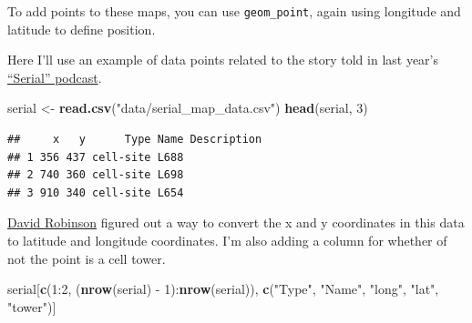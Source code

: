 \documentclass[]{book}
\makeatletter
\newenvironment{Shaded}{\begin{snugshade}}{\end{snugshade}}
\newcommand{\KeywordTok}[1]{\textcolor[rgb]{0.13,0.29,0.53}{\textbf{{#1}}}}
\newcommand{\DataTypeTok}[1]{\textcolor[rgb]{0.13,0.29,0.53}{{#1}}}
\newcommand{\DecValTok}[1]{\textcolor[rgb]{0.00,0.00,0.81}{{#1}}}
\newcommand{\FloatTok}[1]{\textcolor[rgb]{0.00,0.00,0.81}{{#1}}}
\newcommand{\StringTok}[1]{\textcolor[rgb]{0.31,0.60,0.02}{{#1}}}
\newcommand{\NormalTok}[1]{{#1}}
\newenvironment{kframe}{%
\medskip{}
\setlength{\fboxsep}{.8em}
 \def\at@end@of@kframe{}%
 \ifinner\ifhmode%
  \def\at@end@of@kframe{\end{minipage}}%
  \begin{minipage}{\columnwidth}%
 \fi\fi%
 \def\FrameCommand##1{\hskip\@totalleftmargin \hskip-\fboxsep
 \colorbox{shadecolor}{##1}\hskip-\fboxsep
     \hskip-\linewidth \hskip-\@totalleftmargin \hskip\columnwidth}%
 \MakeFramed {\advance\hsize-\width
   \@totalleftmargin\z@ \linewidth\hsize
   \@setminipage}}%
 {\par\unskip\endMakeFramed%
 \at@end@of@kframe}
\renewenvironment{Shaded}{\begin{kframe}}{\end{kframe}}
\makeatother
\begin{document}
To add points to these maps, you can use \texttt{geom\_point}, again
using longitude and latitude to define position. \bigskip

Here I'll use an example of data points related to the story told in
last year's \href{http://serialpodcast.org}{``Serial'' podcast}.

\begin{Shaded}
\begin{Highlighting}[]
\NormalTok{serial <-}\StringTok{ }\KeywordTok{read.csv}\NormalTok{(}\StringTok{"data/serial_map_data.csv"}\NormalTok{)}
\KeywordTok{head}\NormalTok{(serial, }\DecValTok{3}\NormalTok{)}
\end{Highlighting}
\end{Shaded}

\begin{verbatim}
##     x   y      Type Name Description
## 1 356 437 cell-site L688            
## 2 740 360 cell-site L698            
## 3 910 340 cell-site L654
\end{verbatim}

\href{https://github.com/dgrtwo/serial-ggvis/blob/master/serial-preprocessing.Rmd}{David
Robinson} figured out a way to convert the x and y coordinates in this
data to latitude and longitude coordinates. I'm also adding a column for
whether of not the point is a cell tower.

\begin{Shaded}
\end{Shaded}

\begin{Shaded}
\begin{Highlighting}[]
\NormalTok{serial[}\KeywordTok{c}\NormalTok{(}\DecValTok{1}\NormalTok{:}\DecValTok{2}\NormalTok{, (}\KeywordTok{nrow}\NormalTok{(serial) -}\StringTok{ }\DecValTok{1}\NormalTok{):}\KeywordTok{nrow}\NormalTok{(serial)), }
       \KeywordTok{c}\NormalTok{(}\StringTok{"Type"}\NormalTok{, }\StringTok{"Name"}\NormalTok{, }\StringTok{"long"}\NormalTok{, }\StringTok{"lat"}\NormalTok{, }\StringTok{"tower"}\NormalTok{)]}
\end{Highlighting}
\end{Shaded}
\end{document}
